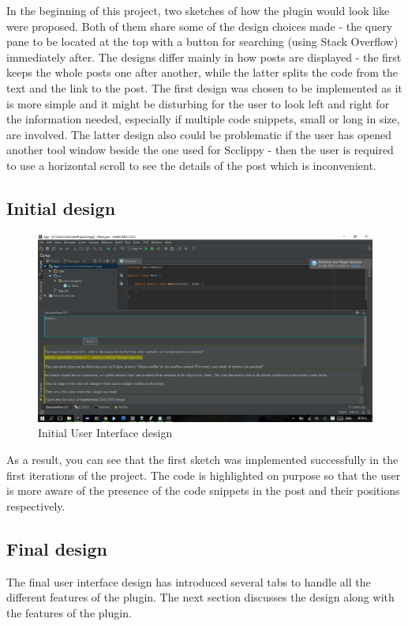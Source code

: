 \documentclass{l4proj}
\begin{document}
In the beginning of this project, two sketches of how the plugin would look like were proposed. Both of them share some of the design choices made - the query pane to be located at the top with a button for searching (using Stack Overflow) immediately after. The designs differ mainly in how posts are displayed - the first keeps the whole posts one after another, while the latter splits the code from the text and the link to the post. The first design was chosen to be implemented as it is more simple and it might be disturbing for the user to look left and right for the information needed, especially if multiple code snippets, small or long in size, are involved. The latter design also could be problematic if the user has opened another tool window beside the one used for Scclippy - then the user is required to use a horizontal scroll to see the details of the post which is inconvenient.

\subsection{Initial design}
\begin{figure}[H]
\includegraphics[scale=0.5]{ui-old}
\centering
\caption{Initial User Interface design}\label{ui-old}
\label{fig:ui-old}
\end{figure}

As a result, you can see that the first sketch was implemented successfully in the first iterations of the project. The code is highlighted on purpose so that the user is more aware of the presence of the code snippets in the post and their positions respectively.

\subsection{Final design}
The final user interface design has introduced several tabs to handle all the different features of the plugin. The next section discusses the design along with the features of the plugin.
\end{document}
